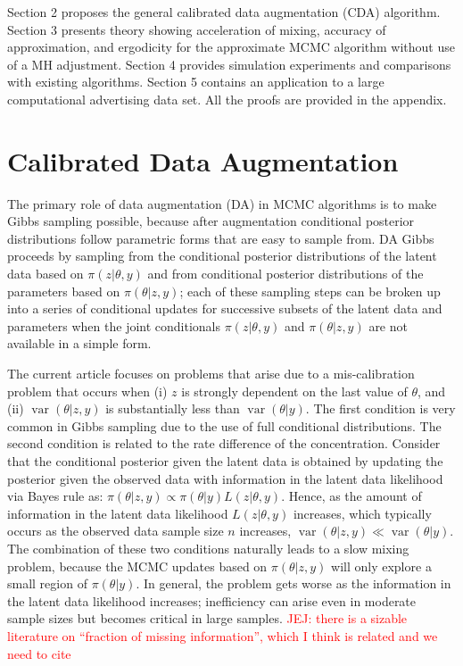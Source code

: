 \documentclass[10pt]{article}
\newcommand{\James}[1]{\textcolor{red}{JEJ: #1}}
\DeclareMathOperator{\var}{var}
\begin{document}
Section 2 proposes the general calibrated data augmentation (CDA) algorithm. Section 3 presents theory showing acceleration of mixing, accuracy of approximation, and ergodicity for the approximate MCMC algorithm without use of a MH adjustment.  Section 4 provides simulation experiments and comparisons with existing algorithms.  Section 5 contains an application to a large computational advertising data set. All the proofs are provided in the appendix. %

\section{Calibrated Data Augmentation}

The primary role of data augmentation (DA) in MCMC algorithms is to make Gibbs sampling possible, because after augmentation conditional posterior distributions follow parametric forms that are easy to sample from.  DA Gibbs proceeds by sampling from the conditional posterior distributions of the latent data based on $\pi(z| \theta,y)$ and from conditional posterior distributions of the parameters based on $\pi(\theta | z,y)$; each of these sampling steps can be broken up into a series of conditional updates for successive subsets of the latent data and parameters when the joint conditionals $\pi(z|\theta,y)$ and $\pi(\theta | z, y)$ are not available in a simple form.

The current article focuses on problems that arise due to a mis-calibration problem that occurs when {(i) \color{red} $z$ is strongly dependent on the last value of $\theta$, and (ii) $\var(\theta | z,y)$ is substantially less than $\var( \theta | y)$.  The first condition is very common in Gibbs sampling due to the use of full conditional distributions.} The second condition is related to the rate difference of the concentration.  Consider that the conditional posterior given the latent data is obtained by updating the posterior given the observed data with information in the latent data likelihood via Bayes rule as: $\pi( \theta | z, y) \propto \pi( \theta | y) L( z | \theta, y)$.  Hence, as the amount of information in the latent data likelihood $L(z | \theta, y)$ increases, which typically occurs as the observed data sample size $n$ increases, $\var(\theta | z,y) \ll \var( \theta | y)$.  The combination of these two conditions naturally leads to a slow mixing problem, because the MCMC updates based on $\pi(\theta | z,y)$ will only explore a small region of $\pi( \theta | y)$.  In general, the problem gets worse as the information in the latent data likelihood increases; inefficiency can arise even in moderate sample sizes but becomes critical in large samples. \James{there is a sizable literature on ``fraction of missing information'', which I think is related and we need to cite}
\end{document}
